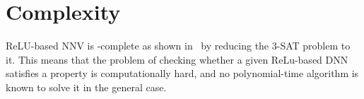 \documentclass[oneside,11pt,dvipsnames]{book}
\numberwithin{equation}{section}
\theoremstyle{definition}
\theoremstyle{remark}
\newcommand{\tvn}[1]{\iftoggle{usecomment}{{\color{red}{[TVN]: #1}}}{}}
\begin{document}





\section{Complexity}\label{sec:complexity}

ReLU-based NNV is \NP{}-complete as shown in~\cite{katz2017reluplex,salzer2023reachability} by reducing the 3-SAT problem to it. This means that the problem of checking whether a given ReLu-based DNN satisfies a property is computationally hard, and no polynomial-time algorithm is known to solve it in the general case.




\end{document}
